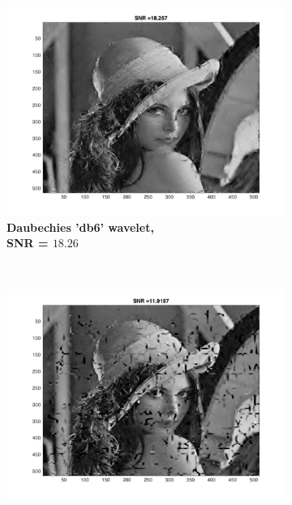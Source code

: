 \begin{figure}
\begin{subfigure}[b]{0.45\textwidth}
        \label{fig:matti_fig_db2}
    \end{subfigure}
    \begin{subfigure}[b]{0.45\textwidth}
        \includegraphics[width=\textwidth]{../src/inpainting/vraag_2_4_db6}
        \caption{\textbf{Daubechies 'db6' wavelet, \\ SNR = $\mathbf{18.26}$} }
        \label{fig:matti_fig_db6}
    \end{subfigure}
    ~ %
    \begin{subfigure}[b]{0.45\textwidth}
        \includegraphics[width=\textwidth]{../src/inpainting/vraag_2_4_bior33}

\end{subfigure}
\end{figure}
